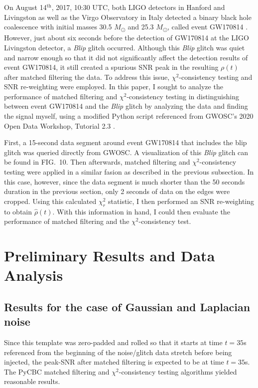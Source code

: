 \documentclass[preprint,
letterpaper,
 amsmath,amssymb,
 aps,
]{revtex4-2}
\begin{document}
On August 14$^{\text{th}}$, 2017, 10:30 UTC, both LIGO detectors in Hanford and Livingston as well as the Virgo Observatory in Italy detected a binary black hole coalescence with initial masses 30.5 $M$\textsubscript{\(\odot\)} and 25.3 $M$\textsubscript{\(\odot\)}, called event GW170814 \cite{blip}. However, just about six seconds before the detection of GW170814 at the LIGO Livingston detector, a \textit{Blip} glitch occurred. Although this \textit{Blip} glitch was quiet and narrow enough so that it did not significantly affect the detection results of event GW170814, it still created a spurious SNR peak in the resulting $\rho(t)$ after matched filtering the data. To address this issue, $\chi^2$-consistency testing and SNR re-weighting were employed. In this paper, I sought to analyze the performance of matched filtering and $\chi^2$-consistency testing in distinguishing between event GW170814 and the \textit{Blip} glitch by analyzing the data and finding the signal myself, using a modified Python script referenced from GWOSC's 2020 Open Data Workshop, Tutorial 2.3 \cite{collaboration2019open}.

First, a 15-second data segment around event GW170814 that includes the blip glitch was queried directly from GWOSC. A visualization of this \textit{Blip} glitch can be found in FIG.\ 10. Then afterwards, matched filtering and $\chi^2$-consistency testing were applied in a similar fasion as described in the previous subsection. In this case, however, since the data segment is much shorter than the 50 seconds duration in the previous section, only 2 seconds of data on the edges were cropped. Using this calculated $\chi_r^2$ statistic, I then performed an SNR re-weighting to obtain $\hat{\rho}(t)$. With this information in hand, I could then evaluate the performance of matched filtering and the $\chi^2$-consistency test.



\section{Preliminary Results and Data Analysis} \label{results}

\subsection{Results for the case of Gaussian and Laplacian noise}
Since this template was zero-padded and rolled so that it starts at time $t=35$s referenced from the beginning of the noise/glitch data stretch before being injected, the peak-SNR after matched filtering is expected to be at time $t=35$s. The PyCBC matched filtering and $\chi^2$-consistency testing algorithms yielded reasonable results.
\end{document}
